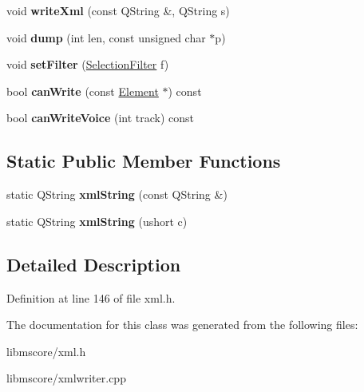 \begin{DoxyCompactItemize}
\item 
\mbox{\label{class_ms_1_1_xml_writer_a83db8568c5ce040c15b12fc33013a82a}} 
void {\bfseries write\+Xml} (const Q\+String \&, Q\+String s)
\item 
\mbox{\label{class_ms_1_1_xml_writer_a04661f85ed9f6685013dfe3a7c5ffc53}} 
void {\bfseries dump} (int len, const unsigned char $\ast$p)
\item 
\mbox{\label{class_ms_1_1_xml_writer_a61fb6dad12df39ab903d6d4f9ce54b67}} 
void {\bfseries set\+Filter} (\hyperlink{class_ms_1_1_selection_filter}{Selection\+Filter} f)
\item 
\mbox{\label{class_ms_1_1_xml_writer_a9821e8f627845e079f7b3b4ade0043f9}} 
bool {\bfseries can\+Write} (const \hyperlink{class_ms_1_1_element}{Element} $\ast$) const
\item 
\mbox{\label{class_ms_1_1_xml_writer_a2aa48c0b3dac0cfdde39c78b9417a344}} 
bool {\bfseries can\+Write\+Voice} (int track) const
\end{DoxyCompactItemize}
\subsection*{Static Public Member Functions}
\begin{DoxyCompactItemize}
\item 
\mbox{\label{class_ms_1_1_xml_writer_ac75b3e5a95c784720452495b95f26466}} 
static Q\+String {\bfseries xml\+String} (const Q\+String \&)
\item 
\mbox{\label{class_ms_1_1_xml_writer_af4d36dc1d0c1967b733aef9e1780e9f7}} 
static Q\+String {\bfseries xml\+String} (ushort c)
\end{DoxyCompactItemize}


\subsection{Detailed Description}


Definition at line 146 of file xml.\+h.



The documentation for this class was generated from the following files\+:\begin{DoxyCompactItemize}
\item 
libmscore/xml.\+h\item 
libmscore/xmlwriter.\+cpp\end{DoxyCompactItemize}
